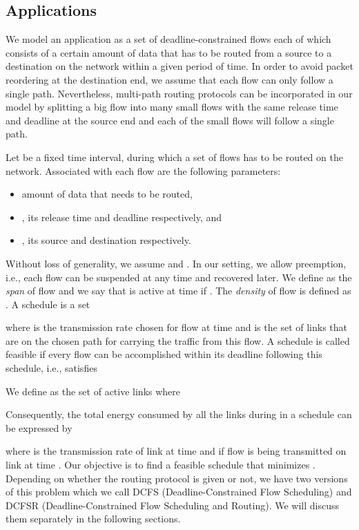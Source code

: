 \documentclass[10pt, conference, compsocconf]{IEEEtran}
\begin{document}
\subsection{Applications}

We model an application as a set of deadline-constrained flows each of which consists of a certain amount of data that has to be routed from a source to a destination on the network within a given period of time. In order to avoid packet reordering at the destination end, we assume that each flow can only follow a single path. Nevertheless, multi-path routing protocols can be incorporated in our model by splitting a big flow into many small flows with the same release time and deadline at the source end and each of the small flows will follow a single path.


Let  be a fixed time interval, during which a set  of flows has to be routed on the network. Associated with each flow  are the following parameters:
\begin{itemize}
\item  amount of data that needs to be routed,
\item ,  its release time and deadline respectively, and
\item ,  its source and destination respectively.
\end{itemize}

Without loss of generality, we assume  and . In our setting, we allow preemption, i.e., each flow can be suspended at any time and recovered later. We define  as the \emph{span} of flow  and we say that  is active at time  if . The \emph{density} of flow  is defined as . A schedule is a set 

where  is the transmission rate chosen for flow  at time  and  is the set of links that are on the chosen path for carrying the traffic from this flow. A schedule is called feasible if every flow can be accomplished within its deadline following this schedule, i.e.,  satisfies

We define  as the set of active links where

Consequently, the total energy consumed by all the links during  in a schedule  can be expressed by

where  is the transmission rate of link  at time  and  if flow  is being transmitted on link  at time . Our objective is to find a feasible schedule that minimizes . Depending on whether the routing protocol is given or not, we have two versions of this problem which we call DCFS (Deadline-Constrained Flow Scheduling) and DCFSR (Deadline-Constrained Flow Scheduling and Routing). We will discuss them separately in the following sections. 
\end{document}
